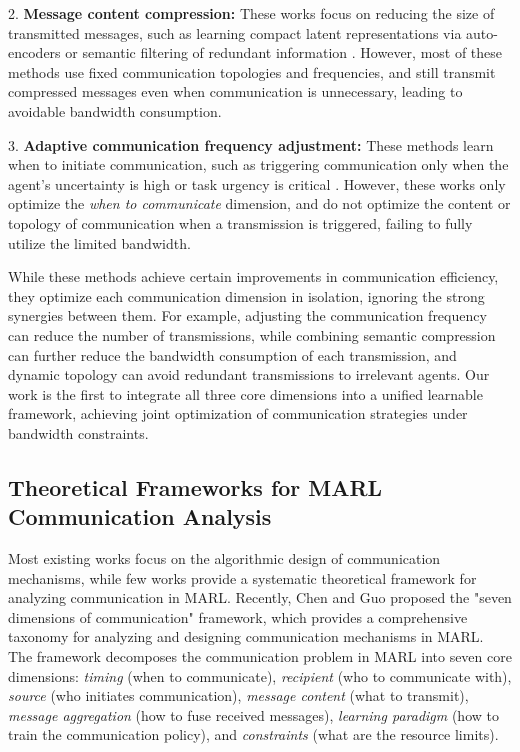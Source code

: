 \documentclass[10pt, twocolumn]{IEEEtran}
\begin{document}
2. \textbf{Message content compression:} These works focus on reducing the size of transmitted messages, such as learning compact latent representations via auto-encoders \cite{lin2019learning} or semantic filtering of redundant information \cite{liu2024semantic}. However, most of these methods use fixed communication topologies and frequencies, and still transmit compressed messages even when communication is unnecessary, leading to avoidable bandwidth consumption.

3. \textbf{Adaptive communication frequency adjustment:} These methods learn when to initiate communication, such as triggering communication only when the agent's uncertainty is high \cite{ding2020adaptive} or task urgency is critical \cite{patel2024learned}. However, these works only optimize the \textit{when to communicate} dimension, and do not optimize the content or topology of communication when a transmission is triggered, failing to fully utilize the limited bandwidth.

While these methods achieve certain improvements in communication efficiency, they optimize each communication dimension in isolation, ignoring the strong synergies between them. For example, adjusting the communication frequency can reduce the number of transmissions, while combining semantic compression can further reduce the bandwidth consumption of each transmission, and dynamic topology can avoid redundant transmissions to irrelevant agents. Our work is the first to integrate all three core dimensions into a unified learnable framework, achieving joint optimization of communication strategies under bandwidth constraints.

\subsection{Theoretical Frameworks for MARL Communication Analysis}
Most existing works focus on the algorithmic design of communication mechanisms, while few works provide a systematic theoretical framework for analyzing communication in MARL. Recently, Chen and Guo \cite{chen2025seven} proposed the "seven dimensions of communication" framework, which provides a comprehensive taxonomy for analyzing and designing communication mechanisms in MARL. The framework decomposes the communication problem in MARL into seven core dimensions: \textit{timing} (when to communicate), \textit{recipient} (who to communicate with), \textit{source} (who initiates communication), \textit{message content} (what to transmit), \textit{message aggregation} (how to fuse received messages), \textit{learning paradigm} (how to train the communication policy), and \textit{constraints} (what are the resource limits).
\end{document}
